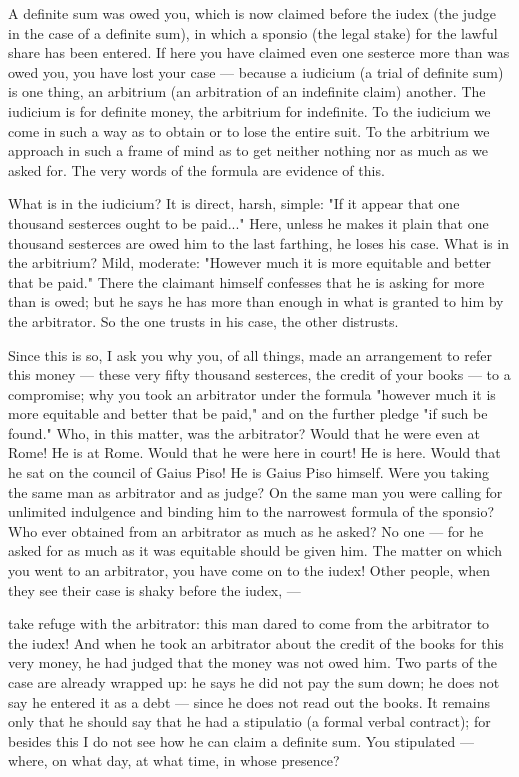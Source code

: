  A definite sum was owed you, which is now claimed before the iudex (the judge in the case of a definite sum), in which a sponsio (the legal stake) for the lawful share has been entered. If here you have claimed even one sesterce more than was owed you, you have lost your case --- because a iudicium (a trial of definite sum) is one thing, an arbitrium (an arbitration of an indefinite claim) another. The iudicium is for definite money, the arbitrium for indefinite. To the iudicium we come in such a way as to obtain or to lose the entire suit. To the arbitrium we approach in such a frame of mind as to get neither nothing nor as much as we asked for. The very words of the formula are evidence of this.

 What is in the iudicium? It is direct, harsh, simple: "If it appear that one thousand sesterces ought to be paid..." Here, unless he makes it plain that one thousand sesterces are owed him to the last farthing, he loses his case. What is in the arbitrium? Mild, moderate: "However much it is more equitable and better that be paid." There the claimant himself confesses that he is asking for more than is owed; but he says he has more than enough in what is granted to him by the arbitrator. So the one trusts in his case, the other distrusts.

 Since this is so, I ask you why you, of all things, made an arrangement to refer this money --- these very fifty thousand sesterces, the credit of your books --- to a compromise; why you took an arbitrator under the formula "however much it is more equitable and better that be paid," and on the further pledge "if such be found." Who, in this matter, was the arbitrator? Would that he were even at Rome! He is at Rome. Would that he were here in court! He is here. Would that he sat on the council of Gaius Piso! He is Gaius Piso himself. Were you taking the same man as arbitrator and as judge? On the same man you were calling for unlimited indulgence and binding him to the narrowest formula of the sponsio? Who ever obtained from an arbitrator as much as he asked? No one --- for he asked for as much as it was equitable should be given him. The matter on which you went to an arbitrator, you have come on to the iudex! Other people, when they see their case is shaky before the iudex, ---

 take refuge with the arbitrator: this man dared to come from the arbitrator to the iudex! And when he took an arbitrator about the credit of the books for this very money, he had judged that the money was not owed him. Two parts of the case are already wrapped up: he says he did not pay the sum down; he does not say he entered it as a debt --- since he does not read out the books. It remains only that he should say that he had a stipulatio (a formal verbal contract); for besides this I do not see how he can claim a definite sum. You stipulated --- where, on what day, at what time, in whose presence?

